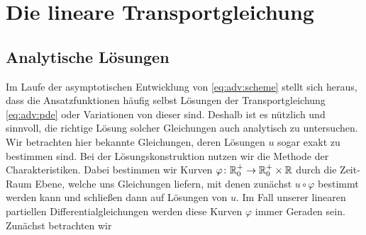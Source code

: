 
\section{Die lineare Transportgleichung}
\subsection{Analytische Lösungen}
\label{appendix:loesungen}
Im Laufe der asymptotischen Entwicklung von \eqref{eq:adv:scheme} stellt sich heraus, dass die Ansatzfunktionen häufig selbst Lösungen der Transportgleichung \eqref{eq:adv:pde} oder Variationen von dieser sind.
Deshalb ist es nützlich und sinnvoll, die richtige Lösung solcher Gleichungen auch analytisch zu untersuchen.
Wir betrachten hier bekannte Gleichungen, deren Lösungen $u$ sogar exakt zu bestimmen sind.
Bei der Lösungskonstruktion nutzen wir die Methode der Charakteristiken.
Dabei bestimmen wir Kurven $\varphi\colon \mathbb R^+_0 \to \mathbb R^+_0 \times \mathbb R$ durch die Zeit-Raum Ebene, welche uns Gleichungen liefern, mit denen zunächst $u \circ \varphi$ bestimmt werden kann und schließen dann auf Lösungen von $u$.
Im Fall unserer linearen partiellen Differentialgleichungen werden diese Kurven $\varphi$ immer Geraden sein.
Zunächst betrachten wir

